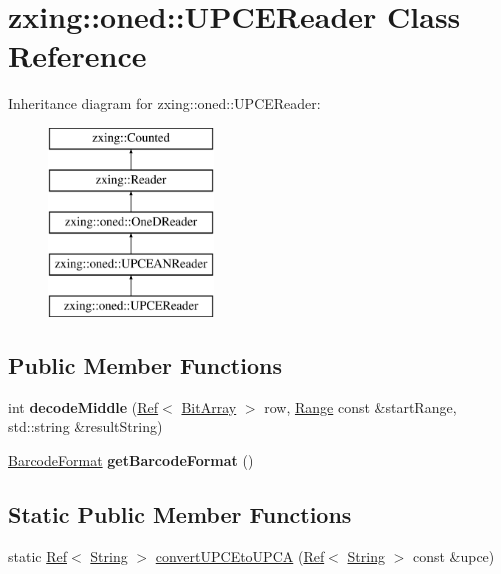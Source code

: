 \hypertarget{classzxing_1_1oned_1_1_u_p_c_e_reader}{}\section{zxing\+:\+:oned\+:\+:U\+P\+C\+E\+Reader Class Reference}
\label{classzxing_1_1oned_1_1_u_p_c_e_reader}
Inheritance diagram for zxing\+:\+:oned\+:\+:U\+P\+C\+E\+Reader\+:\begin{figure}[H]
\begin{center}
\leavevmode
\includegraphics[height=5.000000cm]{classzxing_1_1oned_1_1_u_p_c_e_reader}
\end{center}
\end{figure}
\subsection*{Public Member Functions}
\begin{DoxyCompactItemize}
\item 
\mbox{\label{classzxing_1_1oned_1_1_u_p_c_e_reader_a7ce2e552e361be70a2b2955d30da568b}} 
int {\bfseries decode\+Middle} (\mbox{\hyperlink{classzxing_1_1_ref}{Ref}}$<$ \mbox{\hyperlink{classzxing_1_1_bit_array}{Bit\+Array}} $>$ row, \mbox{\hyperlink{structzxing_1_1oned_1_1_one_d_reader_1_1_range}{Range}} const \&start\+Range, std\+::string \&result\+String)
\item 
\mbox{\label{classzxing_1_1oned_1_1_u_p_c_e_reader_abaf027fba7c3469c44e94693333e230f}} 
\mbox{\hyperlink{classzxing_1_1_barcode_format}{Barcode\+Format}} {\bfseries get\+Barcode\+Format} ()
\end{DoxyCompactItemize}
\subsection*{Static Public Member Functions}
\begin{DoxyCompactItemize}
\item 
static \mbox{\hyperlink{classzxing_1_1_ref}{Ref}}$<$ \mbox{\hyperlink{classzxing_1_1_string}{String}} $>$ \mbox{\hyperlink{classzxing_1_1oned_1_1_u_p_c_e_reader_a3af619d9a00d1102445099bf596a63cc}{convert\+U\+P\+C\+Eto\+U\+P\+CA}} (\mbox{\hyperlink{classzxing_1_1_ref}{Ref}}$<$ \mbox{\hyperlink{classzxing_1_1_string}{String}} $>$ const \&upce)
\end{DoxyCompactItemize}
